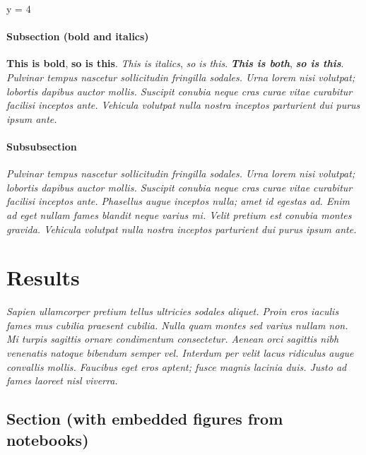 \documentclass[
  a4paper,
]{scrbook}
\newenvironment{Shaded}{\begin{snugshade}}{\end{snugshade}}
\newcommand{\DecValTok}[1]{\textcolor[rgb]{0.69,0.50,0.00}{#1}}
\newcommand{\NormalTok}[1]{\textcolor[rgb]{0.12,0.11,0.11}{#1}}
\newcommand{\OperatorTok}[1]{\textcolor[rgb]{0.12,0.11,0.11}{#1}}
\begin{document}
\begin{Shaded}
\begin{Highlighting}[]
\NormalTok{y }\OperatorTok{=} \DecValTok{4}
\end{Highlighting}
\end{Shaded}

\subsubsection{Subsection (bold and
italics)}\label{subsection-bold-and-italics}

\textbf{This is bold}, \textbf{so is this}. \emph{This is italics},
\emph{so is this}. \textbf{\emph{This is both}}, \textbf{\emph{so is
this}}. \emph{Pulvinar tempus nascetur sollicitudin fringilla sodales.
Urna lorem nisi volutpat; lobortis dapibus auctor mollis. Suscipit
conubia neque cras curae vitae curabitur facilisi inceptos ante.
Vehicula volutpat nulla nostra inceptos parturient dui purus ipsum
ante.}

\subsubsection{Subsubsection}\label{subsubsection}

\emph{Pulvinar tempus nascetur sollicitudin fringilla sodales. Urna
lorem nisi volutpat; lobortis dapibus auctor mollis. Suscipit conubia
neque cras curae vitae curabitur facilisi inceptos ante. Phasellus augue
inceptos nulla; amet id egestas ad. Enim ad eget nullam fames blandit
neque varius mi. Velit pretium est conubia montes gravida. Vehicula
volutpat nulla nostra inceptos parturient dui purus ipsum ante.}

\chapter{Results}\label{results}

\emph{Sapien ullamcorper pretium tellus ultricies sodales aliquet. Proin
eros iaculis fames mus cubilia praesent cubilia. Nulla quam montes sed
varius nullam non. Mi turpis sagittis ornare condimentum consectetur.
Aenean orci sagittis nibh venenatis natoque bibendum semper vel.
Interdum per velit lacus ridiculus augue convallis mollis. Faucibus eget
eros aptent; fusce magnis lacinia duis. Justo ad fames laoreet nisl
viverra.}

\section{Section (with embedded figures from
notebooks)}\label{section-with-embedded-figures-from-notebooks}
\end{document}

